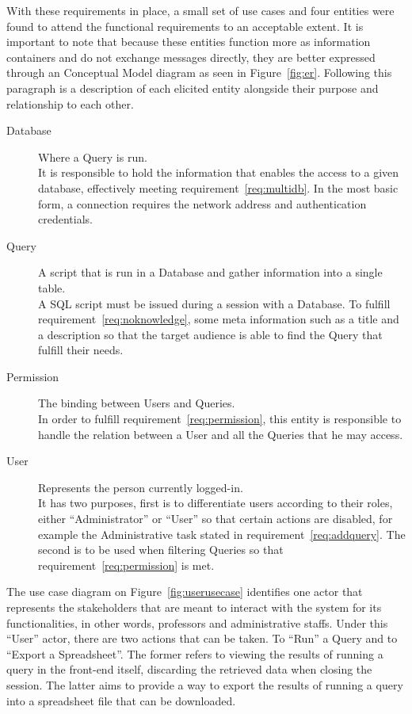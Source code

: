 With these requirements in place, a small set of use cases and four entities were found to attend the functional requirements to an acceptable extent.
It is important to note that because these entities function more as information containers and do not exchange messages directly, they are better expressed through an Conceptual Model diagram as seen in Figure~\ref{fig:er}.
Following this paragraph is a description of each elicited entity alongside their purpose and relationship to each other.

\begin{description}
\item[Database] Where a Query is run.\\
  It is responsible to hold the information that enables the access to a given database, effectively meeting requirement~\ref{req:multidb}.
  In the most basic form, a connection requires the network address and authentication credentials.
\item[Query] A script that is run in a Database and gather information into a single table.\label{model:query}\\
  A \gls{SQL} script must be issued during a session with a Database.
  To fulfill requirement~\ref{req:noknowledge}, some meta information such as a title and a description so that the target audience is able to find the Query that fulfill their needs.
\item[Permission] The binding between Users and Queries.\\
  In order to fulfill requirement~\ref{req:permission}, this entity is responsible to handle the relation between a User and all the Queries that he may access.
\item[User] Represents the person currently logged-in.\\
  It has two purposes, first is to differentiate users according to their roles, either ``Administrator'' or ``User'' so that certain actions are disabled, for example the Administrative task stated in requirement~\ref{req:addquery}.
  The second is to be used when filtering Queries so that requirement~\ref{req:permission} is met.
\end{description}

The use case diagram on Figure~\ref{fig:userusecase} identifies one actor that represents the stakeholders that are meant to interact with the system for its functionalities, in other words,  professors and administrative staffs. Under this ``User'' actor, there are two actions that can be taken. To ``Run'' a Query and to ``Export a Spreadsheet''. The former refers to viewing the results of running a query in the front-end itself, discarding the retrieved data when closing the session. The latter aims to provide a way to export the results of running a query into a spreadsheet file that can be downloaded.

